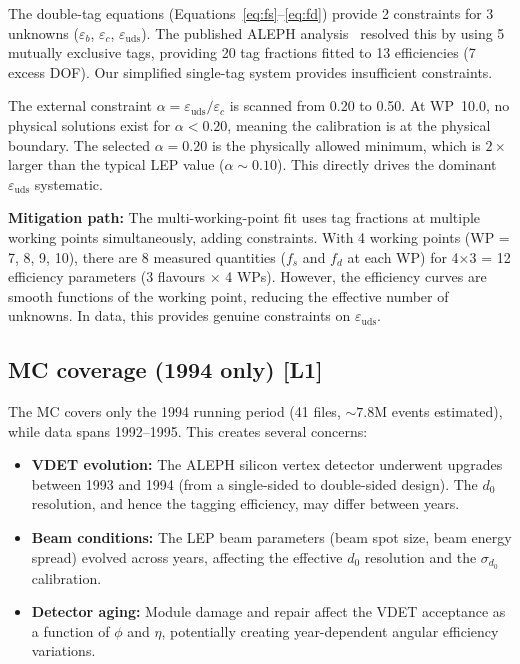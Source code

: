\documentclass[11pt,a4paper]{article}
\begin{document}
The double-tag equations (Equations~\ref{eq:fs}--\ref{eq:fd}) provide 2 constraints
for 3 unknowns ($\varepsilon_b$, $\varepsilon_c$, $\varepsilon_\mathrm{uds}$). The
published ALEPH analysis~\cite{ALEPH:Rb:1996} resolved this by using 5 mutually
exclusive tags, providing 20 tag fractions fitted to 13 efficiencies (7 excess DOF).
Our simplified single-tag system provides insufficient constraints.

The external constraint $\alpha = \varepsilon_\mathrm{uds} / \varepsilon_c$ is scanned
from 0.20 to 0.50. At WP~10.0, no physical solutions exist for $\alpha < 0.20$,
meaning the calibration is at the physical boundary. The selected $\alpha = 0.20$ is
the physically allowed minimum, which is $2\times$ larger than the typical LEP value
($\alpha \sim 0.10$). This directly drives the dominant $\varepsilon_\mathrm{uds}$
systematic.

\textbf{Mitigation path:} The multi-working-point fit uses tag fractions at multiple
working points simultaneously, adding constraints. With 4 working points (WP = 7, 8, 9, 10),
there are 8 measured quantities ($f_s$ and $f_d$ at each WP) for 4$\times$3 = 12
efficiency parameters (3 flavours $\times$ 4 WPs). However, the efficiency curves
are smooth functions of the working point, reducing the effective number of unknowns.
In data, this provides genuine constraints on $\varepsilon_\mathrm{uds}$.

\subsection{MC coverage (1994 only) [L1]}

The MC covers only the 1994 running period (41 files, $\sim 7.8$M events estimated),
while data spans 1992--1995. This creates several concerns:

\begin{itemize}
\item \textbf{VDET evolution:} The ALEPH silicon vertex detector underwent upgrades
between 1993 and 1994 (from a single-sided to double-sided design). The $d_0$
resolution, and hence the tagging efficiency, may differ between years.

\item \textbf{Beam conditions:} The LEP beam parameters (beam spot size, beam energy
spread) evolved across years, affecting the effective $d_0$ resolution and the
$\sigma_{d_0}$ calibration.

\item \textbf{Detector aging:} Module damage and repair affect the VDET acceptance
as a function of $\phi$ and $\eta$, potentially creating year-dependent angular
efficiency variations.
\end{itemize}
\end{document}
